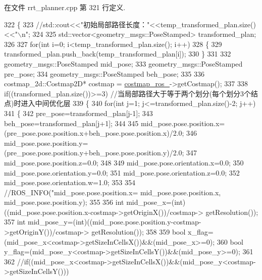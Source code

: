 在文件 rrt\-\_\-planner.\-cpp 第 321 行定义.


\begin{DoxyCode}
322 \{
323     \textcolor{comment}{//std::cout<<"初始局部路径长度："<<temp\_transformed\_plan.size()<<"\(\backslash\)n";}
324 
325     std::vector<geometry\_msgs::PoseStamped> transformed\_plan;
326     
327     \textcolor{keywordflow}{for}(\textcolor{keywordtype}{int} i=0; i<temp\_transformed\_plan.size(); i++)
328     \{
329         transformed\_plan.push\_back(temp\_transformed\_plan[i]);
330     \}
331 
332     geometry\_msgs::PoseStamped mid\_pose;
333     geometry\_msgs::PoseStamped pre\_pose;
334     geometry\_msgs::PoseStamped beh\_pose;
335 
336     costmap\_2d::Costmap2D* costmap = \hyperlink{classrrt__plan_1_1rrt__planner_a3dcf8908136ace532176511eb1861528}{costmap\_ros\_}->getCostmap();
337 
338     \textcolor{keywordflow}{if}((transformed\_plan.size())>=3)  \textcolor{comment}{//当局部路径大于等于两个划分(每个划分3个结点)时进入中间优化层}
339     \{
340         \textcolor{keywordflow}{for}(\textcolor{keywordtype}{int} j=1; j<=transformed\_plan.size()-2; j++)
341         \{
342                    pre\_pose=transformed\_plan[j-1];
343                    beh\_pose=transformed\_plan[j+1];
344                    
345                    mid\_pose.pose.position.x=(pre\_pose.pose.position.x+beh\_pose.pose.position.x)/2.0;
346                    mid\_pose.pose.position.y=(pre\_pose.pose.position.y+beh\_pose.pose.position.y)/2.0;
347                    mid\_pose.pose.position.z=0.0;
348                   
349                    mid\_pose.pose.orientation.x=0.0;
350                    mid\_pose.pose.orientation.y=0.0;
351                    mid\_pose.pose.orientation.z=0.0;
352                    mid\_pose.pose.orientation.w=1.0;
353 
354                    \textcolor{comment}{//ROS\_INFO("mid\_pose.pose.position.x=%
       mid\_pose.pose.position.x, mid\_pose.pose.position.y);}
355 
356                    \textcolor{keywordtype}{int} mid\_pose\_x=(int)((mid\_pose.pose.position.x-costmap->getOriginX())/costmap->
      getResolution());
357                    \textcolor{keywordtype}{int} mid\_pose\_y=(int)((mid\_pose.pose.position.y-costmap->getOriginY())/costmap->
      getResolution());
358                    
359                    \textcolor{keywordtype}{bool} x\_flag=(mid\_pose\_x<costmap->getSizeInCellsX())&&(mid\_pose\_x>=0);
360                    \textcolor{keywordtype}{bool} y\_flag=(mid\_pose\_y<costmap->getSizeInCellsY())&&(mid\_pose\_y>=0);
361                    
362                    \textcolor{comment}{//if((mid\_pose\_x<costmap->getSizeInCellsX())&&(mid\_pose\_y<costmap->getSizeInCellsY()))}

\end{DoxyCode}
